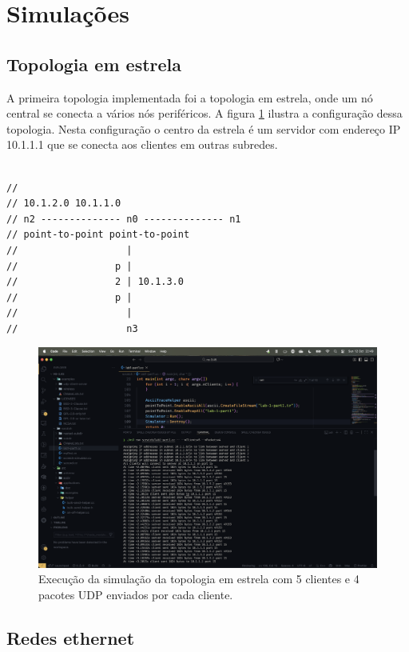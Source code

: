 \documentclass[12pt,a4paper]{article}
\begin{document}
\section{Simulações}

\subsection{Topologia em estrela}

A primeira topologia implementada foi a topologia em estrela, onde um nó central se conecta a vários nós periféricos. A figura \ref{fig:star_topology} ilustra a configuração dessa topologia. Nesta configuração o centro da estrela é um servidor com endereço IP 10.1.1.1 que se conecta aos clientes em outras subredes.

\begin{verbatim}
  
//
// 10.1.2.0 10.1.1.0
// n2 -------------- n0 -------------- n1
// point-to-point point-to-point
//                   |
//                 p |
//                 2 | 10.1.3.0
//                 p |
//                   |
//                   n3

\end{verbatim}


\begin{figure}[H]
    \centering
    \includegraphics[width=1\textwidth]{lab1_exec_5_4.png}
    \caption{Execução da simulação da topologia em estrela com 5 clientes e 4 pacotes UDP enviados por cada cliente.}
    \label{fig:star_topology}
\end{figure}

\subsection{Redes ethernet}
\end{document}

